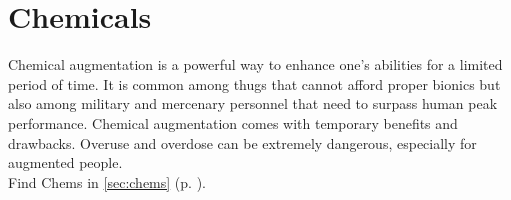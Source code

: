 \section{Chemicals}
Chemical augmentation is a powerful way to enhance one’s abilities for a limited period of time.
It is common among thugs that cannot afford proper bionics but also among military
	and mercenary personnel that need to surpass human peak performance.
Chemical augmentation comes with temporary benefits
	and drawbacks.
Overuse and overdose can be extremely dangerous,
	especially for augmented people.
\\%
Find Chems in \ref{sec:chems} (p. \pageref{sec:chems}).
